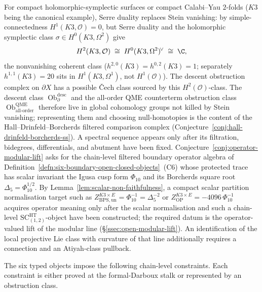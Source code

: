 \begin{rmk}
\label{rmk:compact-nonstein-targets}
For compact holomorphic-symplectic surfaces or compact Calabi--Yau
\(2\)-folds (\(K3\) being the canonical example), Serre duality
replaces Stein vanishing: by simple-connectedness \(H^1(K3,\mathcal O)=0\), but Serre
duality and the holomorphic symplectic class
\(\sigma\in H^0(K3,\Omega^2)\) give
\[
  H^2(K3,\mathcal O)\;\cong\;H^0(K3,\Omega^2)^{\!\vee}\;\cong\;\C,
\]
the nonvanishing coherent class
(\(h^{2,0}(K3)=h^{0,2}(K3)=1\); separately \(h^{1,1}(K3)=20\) sits in
\(H^1(K3,\Omega^1)\), not \(H^1(\mathcal O)\)).  The descent
obstruction complex on \(\partial X\) has a possible Čech class
sourced by this \(H^2(\mathcal O)\)-class.
The descent class
\(\operatorname{Ob}^{\mathrm{desc}}_\partial\) and the all-order QME
counterterm obstruction class
\(\operatorname{Ob}^{\mathrm{QME}}_{\mathrm{all\mbox{-}order}}\)
therefore live in global cohomology groups not killed by Stein
vanishing; representing them and choosing null-homotopies is the
content of the Hall--Drinfeld--Borcherds filtered comparison complex
(Conjecture~\ref{conj:hall-drinfeld-borcherds-ss}).  A spectral
sequence appears only after its filtration, bidegrees, differentials,
and abutment have been fixed.
Conjecture~\ref{conj:operator-modular-lift} asks for the chain-level
filtered boundary operator algebra of
Definition~\ref{defn:six-boundary-open-closed-objects}~(C6) whose
protected trace has scalar invariant the Igusa cusp form \(\Phi_{10}\) and
its Borcherds square root \(\Delta_5=\Phi_{10}^{1/2}\).  By
Lemma~\ref{lem:scalar-non-faithfulness}, a compact scalar partition
normalisation target such as
\(Z^{K3\times E}_{\mathrm{BPS,un}}=\Phi_{10}^{-1}=\Delta_5^{-2}\)
or \(Z^{K3\times E}_{\mathrm{OP}}=-4096\,\Phi_{10}^{-1}\) acquires
operator meaning only after the scalar normalisation and such a
chain-level \(\mathrm{SC}^{\mathrm{HT}}_{(1,2)}\)-object have been
constructed; the required datum is the operator-valued lift of the modular line
(\S\ref{ssec:open-modular-lift}).  An identification of the local
projective Lie class with curvature of that line additionally requires
a connection and an Atiyah-class pullback.
\end{rmk}



The six typed objects impose the following chain-level constraints.  Each
constraint is either proved at the formal-Darboux stalk or represented
by an obstruction class.

